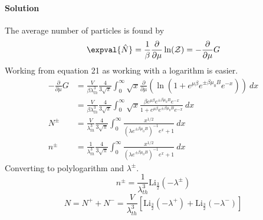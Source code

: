\documentclass{article}
\begin{document}
\begin{enumerate}
		\paragraph{Solution} The average number of particles is found by
		\begin{equation}
			\expval{\hat{N}} = \frac{1}{\beta} \frac{\partial}{\partial \mu} \ln(\mathcal{Z}) = -\frac{\partial}{\partial \mu} G
		\end{equation}
		Working from equation 21 as working with a logarithm is easier.
		\begin{align}
			-\frac{\partial}{\partial \mu} G &= \frac{V}{\beta \lambda^3_{th}} \frac{4}{3\sqrt{\pi}} \int_0^\infty \sqrt{x} \frac{\partial}{\partial \mu} \left( \ln\left( 1 + e^{\mu \beta} e^{\pm \beta \mu_0 B} e^{-x} \right) \right)  \ dx \\
			&= \frac{V}{\beta \lambda^3_{th}} \frac{4}{3\sqrt{\pi}} \int_0^\infty \sqrt{x} \frac{\beta e^{\mu \beta} e^{\pm\beta \mu_0 B} e^{-x}}{1 + e^{\mu \beta} e^{\pm \beta \mu_0 B} e^{-x}} \ dx \\
			N^\pm &= \frac{V}{\lambda^3_{th}} \frac{4}{3\sqrt{\pi}} \int_0^\infty \frac{x^{1/2}}{(\lambda e^{\pm\beta \mu_0 B})^{-1} e^{x} + 1} \ dx \\
			n^\pm &= \frac{1}{\lambda^3_{th}} \frac{4}{3\sqrt{\pi}} \int_0^\infty \frac{x^{1/2}}{(\lambda e^{\pm\beta \mu_0 B})^{-1} e^{x} + 1} \ dx
		\end{align}
		Converting to polylogarithm and $\lambda^\pm$.
		\begin{equation}
			\boxed{n^\pm = \frac{1}{\lambda^3_{th}} \mathrm{Li}_{\frac{3}{2}}(-\lambda^\pm)}
		\end{equation}
		\begin{equation}
			N = N^+ + N^- = \frac{V}{\lambda^3_{th}} \left[ \mathrm{Li}_{\frac{3}{2}}(-\lambda^+) + \mathrm{Li}_{\frac{3}{2}}(-\lambda^-) \right]
		\end{equation}
		

\end{enumerate}
\end{document}
